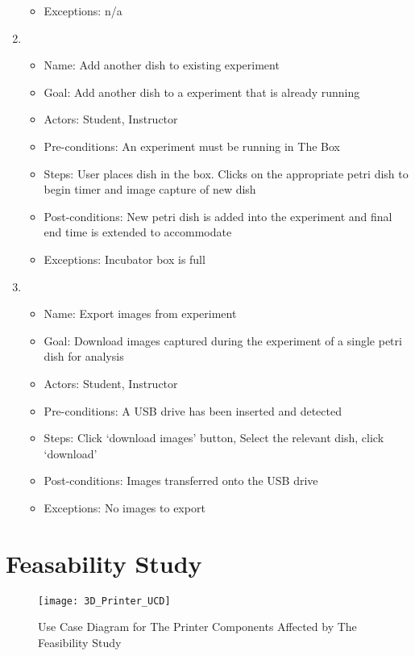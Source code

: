 \begin{enumerate}
\begin{itemize}
		\item Exceptions: n/a
	\end{itemize}
	\item 
	\begin{itemize}
		\item Name: Add another dish to existing experiment
		\item Goal: Add another dish to a experiment that is already running 
		\item Actors:  Student, Instructor
		\item Pre-conditions: An experiment must be running in The Box
		\item Steps: User places dish in the box. Clicks on the appropriate petri dish to begin timer and image capture of new dish
		\item Post-conditions: New petri dish is added into the experiment and final end time is extended to accommodate 
		\item Exceptions: Incubator box is full
	\end{itemize}
	\item 
	\begin{itemize}
		\item Name: Export images from experiment
		\item Goal: Download images captured during the experiment of a single petri dish for analysis
		\item Actors:  Student, Instructor
		\item Pre-conditions: A USB drive has been inserted and detected
		\item Steps: Click `download images' button, Select the relevant dish, click `download'
		\item Post-conditions: Images transferred onto the USB drive
		\item Exceptions: No images to export
	\end{itemize}
\end{enumerate}

\section{Feasability Study}

\begin{figure}[H]
\caption{\label{figure:3D_Printer_UCD} Use Case Diagram for The Printer Components Affected by The Feasibility Study}
\texttt{[image: 3D\_Printer\_UCD]}
\end{figure}

